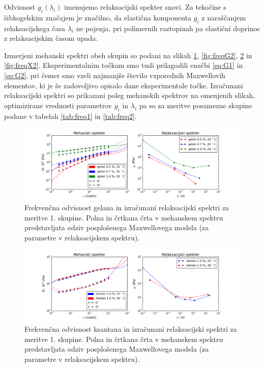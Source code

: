 \documentclass{article}
\begin{document}
Odvisnost $g_i(\lambda_i)$ imenujemo relaksacijski spekter snovi. Za tekočine s šibkogelskim značajem je značilno, da elastična komponenta $g_i$ z naraščanjem relaksacijskega časa $\lambda_i$ ne pojenja, pri polimernih raztopinah pa elastični doprinos z relaksacijskim časom upada.

Izmerjeni mehanski spektri obeh skupin so podani na slikah \ref{fig:freqG1}, \ref{fig:freqG2}, \ref{fig:freqX1} in \ref{fig:freqX2}. Eksperimentalnim točkam smo tudi prilagodili enačbi \ref{eq:G1} in \ref{eq:G2}, pri čemer smo vzeli najmanjše število vzporednih Maxwellovih elementov, ki je še zadovoljivo opisalo dane eksperimentale točke. Izračunani relaksacijski spektri so prikazani poleg mehanskih spektrov na omenjenih slikah, optimizirane vrednosti parametrov $g_i$ in $\lambda_i$ pa so za meritve posamezne skupine podane v tabelah \ref{tab:freq1} in \ref{tab:freq2}.

\begin{figure}
  \centering
  \includegraphics[width=\linewidth]{S1_gelan.png}
  \caption{Frekvenčna odvisnost gelana in izračunani relaksacijski spektri za meritve 1. skupine. Polna in črtkana črta v mehanskem spektru predstavljata odziv posplošenega Maxwellovega modela (za parametre v relaksacijskem spektru).}
  \label{fig:freqG1}
\end{figure}

\begin{figure}
  \centering
  \includegraphics[width=\linewidth]{S1_xantan.png}
  \caption{Frekvenčna odvisnost ksantana in izračunani relaksacijski spektri za meritve 1. skupine. Polna in črtkana črta v mehanskem spektru predstavljata odziv posplošenega Maxwellovega modela (za parametre v relaksacijskem spektru).}
  \label{fig:freqX1}
\end{figure}
\end{document}
